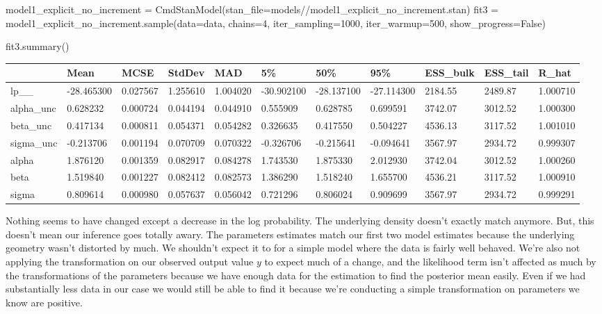 \documentclass[
  letterpaper,
  DIV=11,
  numbers=noendperiod]{scrartcl}
\newenvironment{Shaded}{\begin{snugshade}}{\end{snugshade}}
\newcommand{\DecValTok}[1]{\textcolor[rgb]{0.68,0.00,0.00}{#1}}
\newcommand{\NormalTok}[1]{\textcolor[rgb]{0.00,0.23,0.31}{#1}}
\newcommand{\OperatorTok}[1]{\textcolor[rgb]{0.37,0.37,0.37}{#1}}
\newcommand{\StringTok}[1]{\textcolor[rgb]{0.13,0.47,0.30}{#1}}
\newcommand{\VariableTok}[1]{\textcolor[rgb]{0.07,0.07,0.07}{#1}}
\begin{document}
\begin{Shaded}
\begin{Highlighting}[]
\NormalTok{model1\_explicit\_no\_increment }\OperatorTok{=}\NormalTok{ CmdStanModel(stan\_file}\OperatorTok{=}\StringTok{\textquotesingle{}models//model1\_explicit\_no\_increment.stan\textquotesingle{}}\NormalTok{)}
\NormalTok{fit3 }\OperatorTok{=}\NormalTok{ model1\_explicit\_no\_increment.sample(data}\OperatorTok{=}\NormalTok{data, chains}\OperatorTok{=}\DecValTok{4}\NormalTok{, iter\_sampling}\OperatorTok{=}\DecValTok{1000}\NormalTok{, iter\_warmup}\OperatorTok{=}\DecValTok{500}\NormalTok{, show\_progress}\OperatorTok{=}\VariableTok{False}\NormalTok{)}

\NormalTok{fit3.summary()}
\end{Highlighting}
\end{Shaded}

\begin{longtable}[]{@{}lllllllllll@{}}
\toprule\noalign{}
& Mean & MCSE & StdDev & MAD & 5\% & 50\% & 95\% & ESS\_bulk & ESS\_tail
& R\_hat \\
\midrule\noalign{}
\endhead
\bottomrule\noalign{}
\endlastfoot
lp\_\_ & -28.465300 & 0.027567 & 1.255610 & 1.004020 & -30.902100 &
-28.137100 & -27.114300 & 2184.55 & 2489.87 & 1.000710 \\
alpha\_unc & 0.628232 & 0.000724 & 0.044194 & 0.044910 & 0.555909 &
0.628785 & 0.699591 & 3742.07 & 3012.52 & 1.000300 \\
beta\_unc & 0.417134 & 0.000811 & 0.054371 & 0.054282 & 0.326635 &
0.417550 & 0.504227 & 4536.13 & 3117.52 & 1.001010 \\
sigma\_unc & -0.213706 & 0.001194 & 0.070709 & 0.070322 & -0.326706 &
-0.215641 & -0.094641 & 3567.97 & 2934.72 & 0.999307 \\
alpha & 1.876120 & 0.001359 & 0.082917 & 0.084278 & 1.743530 & 1.875330
& 2.012930 & 3742.04 & 3012.52 & 1.000260 \\
beta & 1.519840 & 0.001227 & 0.082412 & 0.082573 & 1.386290 & 1.518240 &
1.655700 & 4536.21 & 3117.52 & 1.000910 \\
sigma & 0.809614 & 0.000980 & 0.057637 & 0.056042 & 0.721296 & 0.806024
& 0.909699 & 3567.97 & 2934.72 & 0.999291 \\
\end{longtable}

Nothing seems to have changed except a decrease in the log probability.
The underlying density doesn't exactly match anymore. But, this doesn't
mean our inference goes totally awary. The parameters estimates match
our first two model estimates because the underlying geometry wasn't
distorted by much. We shouldn't expect it to for a simple model where
the data is fairly well behaved. We're also not applying the
transformation on our observed output value \(y\) to expect much of a
change, and the likelihood term isn't affected as much by the
transformations of the parameters because we have enough data for the
estimation to find the posterior mean easily. Even if we had
substantially less data in our case we would still be able to find it
because we're conducting a simple transformation on parameters we know
are positive.
\end{document}
